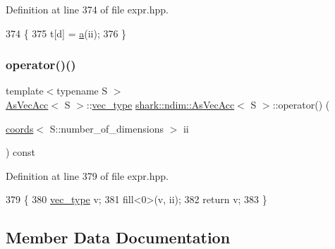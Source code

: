 Definition at line 374 of file expr.\+hpp.


\begin{DoxyCode}
374                                                                                   \{
375             t[d] = \hyperlink{classshark_1_1ndim_1_1_as_vec_acc_3_01_s_01_4_a9145bd6eafb611f2d6fd285fe5e99f98}{a}(ii);
376         \}
\end{DoxyCode}
\hypertarget{classshark_1_1ndim_1_1_as_vec_acc_3_01_s_01_4_aacb0dbfa403236e9354092eb73392976}{}\label{classshark_1_1ndim_1_1_as_vec_acc_3_01_s_01_4_aacb0dbfa403236e9354092eb73392976} 
\subsubsection{\texorpdfstring{operator()()}{operator()()}}
{\footnotesize\ttfamily template$<$typename S $>$ \\
\hyperlink{classshark_1_1ndim_1_1_as_vec_acc}{As\+Vec\+Acc}$<$ S $>$\+::\hyperlink{classshark_1_1ndim_1_1_as_vec_acc_3_01_s_01_4_af7ad5a410cbc56cbfe74caea237b9e07}{vec\+\_\+type} \hyperlink{classshark_1_1ndim_1_1_as_vec_acc}{shark\+::ndim\+::\+As\+Vec\+Acc}$<$ S $>$\+::operator() (\begin{DoxyParamCaption}\item[{\hyperlink{structshark_1_1ndim_1_1coords}{coords}$<$ S\+::number\+\_\+of\+\_\+dimensions $>$}]{ii }\end{DoxyParamCaption}) const\hspace{0.3cm}{\ttfamily [inline]}}



Definition at line 379 of file expr.\+hpp.


\begin{DoxyCode}
379                                                                                                           \{
380             \hyperlink{classshark_1_1ndim_1_1_as_vec_acc_3_01_s_01_4_af7ad5a410cbc56cbfe74caea237b9e07}{vec\_type} v;
381             fill<0>(v, ii);
382             \textcolor{keywordflow}{return} v;
383         \}
\end{DoxyCode}


\subsection{Member Data Documentation}
\hypertarget{classshark_1_1ndim_1_1_as_vec_acc_3_01_s_01_4_a9145bd6eafb611f2d6fd285fe5e99f98}{}\label{classshark_1_1ndim_1_1_as_vec_acc_3_01_s_01_4_a9145bd6eafb611f2d6fd285fe5e99f98} 
